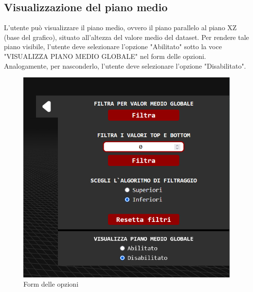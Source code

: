 \subsection{Visualizzazione del piano medio}
L'utente può visualizzare il piano medio, ovvero il piano parallelo al
piano XZ (base del grafico), situato all'altezza del valore medio del dataset.
Per rendere tale piano visibile, l'utente deve selezionare l'opzione "Abilitato" sotto la voce
"VISUALIZZA PIANO MEDIO GLOBALE" nel form delle opzioni. Analogamente, per
nasconderlo, l'utente deve selezionare l'opzione "Disabilitato".
\begin{figure}
    \centering
    \includegraphics[scale=0.6]{template/images/options.png}
    \caption{Form delle opzioni}
\end{figure}


